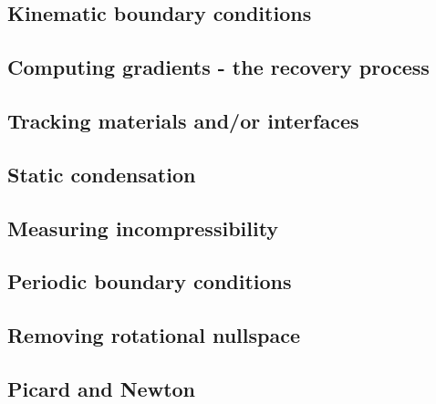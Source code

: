 \documentclass[a4paper]{article}
\numberwithin{equation}{section}
\begin{document}
\subsection{Kinematic boundary conditions}\label{kin_bc}  %
\newpage %
\subsection{Computing gradients - the recovery process}  %
\newpage %
\subsection{Tracking materials and/or interfaces}  %
\newpage %
\subsection{Static condensation}  %
\newpage %
\subsection{Measuring incompressibility \label{ss_incomp}}  %
\newpage %
\subsection{Periodic boundary conditions\label{ss_periodic}} %
\newpage %
\subsection{Removing rotational nullspace\label{ss_nullspace}}  %
\newpage %
\subsection{Picard and Newton \label{ss_nonlinear}}  %
\newpage %
\end{document}
